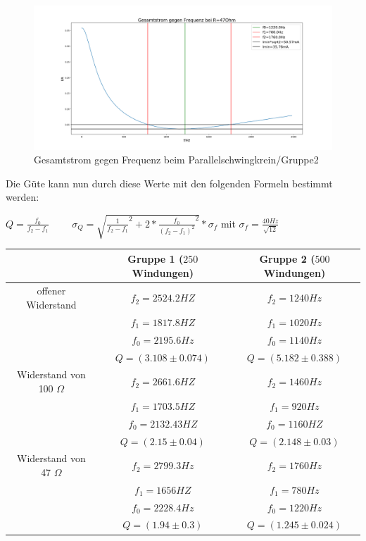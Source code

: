 \documentclass[a4paper, 11pt]{article}
\begin{document}
\begin{figure}[H]

	\hskip -2.5cm
	\includegraphics[trim = 0mm 0mm 0mm 0mm,clip, width=20cm]{Bilder/DPParallel47_Breite.png}%
	\caption[Gesamtstrom gegen Frequenz beim Parallelschwingkrein/Gruppe2]{Gesamtstrom gegen Frequenz beim Parallelschwingkrein/Gruppe2}%
	\label{pic:Abbildung 2}%

\end{figure}

Die Güte kann nun durch diese Werte mit den folgenden Formeln bestimmt werden:
\begin{center}
$Q=\frac{f_0}{f_2-f_1}\:\;\;\:\;\;\:\;\; \sigma_Q=\sqrt{\frac{1}{f_2-f_1}^2+2*\frac{f_0}{(f_2-f_1)^2}^2}*\sigma_f$ \newline \newline
mit $\sigma_f=\frac{40Hz}{\sqrt{12}}$
\end{center}


\begin{tabular}{|c|c|c|}
\hline 	$ $ 	&	Gruppe 1 ($250$ Windungen)	&	Gruppe 2 ($500$ Windungen) \\
\hline 	offener Widerstand 	&	$ f_2 =2524.2HZ$					&	$ f_2 = 1240Hz$	\\
\hline 	$ $ 	&	$ f_1 = 1817.8HZ$					&	$ f_1 = 1020Hz$	\\
\hline 	$ $ 	&	$ f_0 = 2195.6Hz$					&	$ f_0 = 1140Hz$	\\
\hline 		&	$ Q = (3.108 \pm 0.074) $	&	$ Q = (5.182 \pm 0.388)  $ \\
\hline	Widerstand von 100 $\Omega$	&	$ f_2 = 2661.6HZ$					&	$ f_2 = 1460Hz$	\\
\hline 	$ $ 	&	$ f_1 = 1703.5HZ$					&	$ f_1 = 920Hz$	\\
\hline 	$ $ 	&	$ f_0 = 2132.43HZ$					&	$ f_0 = 1160HZ$	\\
\hline 		&	$ Q = (2.15 \pm 0.04)$	&	$ Q = (2.148 \pm 0.03)  $ \\
\hline	Widerstand von 47 $\Omega$	&	$ f_2 = 2799.3Hz$					&	$ f_2 = 1760Hz$	\\
\hline 	$ $ 	&	$ f_1 = 1656HZ$					&	$ f_1 = 780Hz$	\\
\hline 	$ $ 	&	$ f_0 = 2228.4Hz$					&	$ f_0 = 1220Hz$	\\
\hline 		&	$ Q = (1.94 \pm 0.3) $	&	$ Q = (1.245 \pm 0.024)  $ \\
\hline	
\end{tabular}
\newpage
\end{document}
